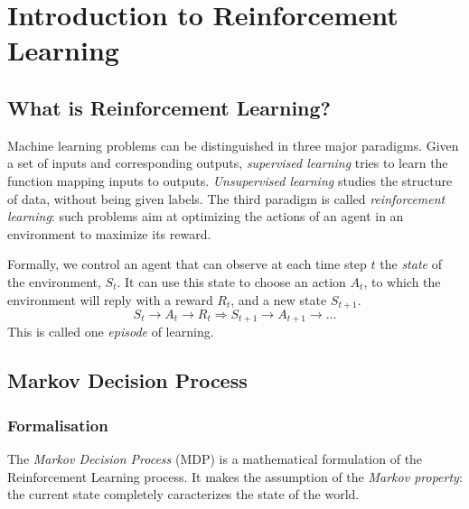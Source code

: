\section{Introduction to Reinforcement Learning}
\subsection{What is Reinforcement Learning?}
Machine learning problems can be distinguished in three major paradigms. Given a set of inputs and corresponding outputs, \emph{supervised learning} tries to learn the function mapping inputs to outputs. \emph{Unsupervised learning} studies the structure of data, without being given labels. The third paradigm is called \emph{reinforcement learning}: such problems aim at optimizing the actions of an agent in an environment to maximize its reward.

Formally, we control an agent that can observe at each time step $t$ the \emph{state} of the environment, $S_t$. It can use this state to choose an action $A_t$, to which the environment will reply with a reward $R_t$, and a new state $S_{t+1}$.
\begin{equation*}
    S_t\longrightarrow A_t\longrightarrow R_t \Longrightarrow S_{t+1}\longrightarrow A_{t+1} \longrightarrow \dots
\end{equation*}
This is called one \emph{episode} of learning.

\subsection{Markov Decision Process}
\subsubsection{Formalisation}
The \emph{Markov Decision Process} (MDP) is a mathematical formulation of the Reinforcement Learning process. It makes the assumption of the \emph{Markov property}: the current state completely caracterizes the state of the world.

